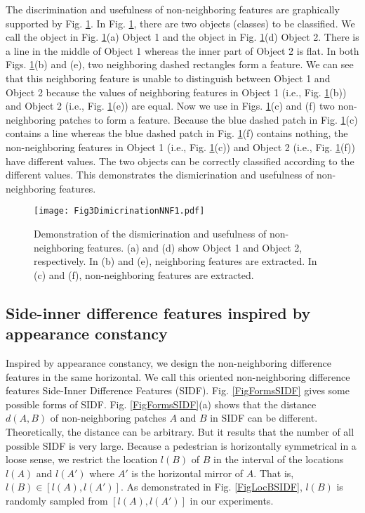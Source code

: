 \documentclass[10pt,twocolumn,letterpaper]{article}
\begin{document}
The discrimination and usefulness of non-neighboring features are 
graphically supported by Fig. \ref{FigDimicrinationNNF}. In Fig. \ref{FigDimicrinationNNF}, there are two objects (classes) 
to be classified. We call the object in Fig. \ref{FigDimicrinationNNF}(a) Object 1 and the object in 
Fig. \ref{FigDimicrinationNNF}(d) Object 2. There is a line 
in the middle of Object 1 whereas the inner part of Object 2 is flat. In both Figs. \ref{FigDimicrinationNNF}(b) and (e), two neighboring 
dashed rectangles form a feature. We can see that this neighboring feature 
is unable to distinguish between Object 1 and Object 2 because the values of 
neighboring features in Object 1 (i.e., Fig. \ref{FigDimicrinationNNF}(b)) and Object 2 (i.e., Fig. 
\ref{FigDimicrinationNNF}(e)) are equal. Now we use in Figs. \ref{FigDimicrinationNNF}(c) and (f) two non-neighboring 
patches to form a feature. Because the blue dashed patch in Fig. \ref{FigDimicrinationNNF}(c) 
contains a line whereas the blue dashed patch in Fig. \ref{FigDimicrinationNNF}(f) contains 
nothing, the non-neighboring features in Object 1 (i.e., Fig. \ref{FigDimicrinationNNF}(c)) and 
Object 2 (i.e., Fig. \ref{FigDimicrinationNNF}(f)) have different values. The two objects can be 
correctly classified according to the different values. This demonstrates 
the dismicrination and usefulness of non-neighboring features. 

\begin{figure}[!t]
\centering
\texttt{[image: Fig3DimicrinationNNF1.pdf]}
\caption{Demonstration of the dismicrination and usefulness of non-neighboring features. (a) and (d) show Object 1 and Object 2, respectively. In (b) and (e), neighboring features are extracted. In (c) and (f), non-neighboring features are extracted.}
\label{FigDimicrinationNNF}
\end{figure}

\subsection{Side-inner difference features inspired by appearance constancy}
Inspired by appearance constancy, we design the non-neighboring difference 
features in the same horizontal. We call this oriented non-neighboring 
difference features Side-Inner Difference Features (SIDF). Fig. \ref{FigFormsSIDF} gives some 
possible forms of SIDF. Fig. \ref{FigFormsSIDF}(a) shows that the distance $d(A,B)$ of non-neighboring patches $A$ and $B$ in SIDF can be 
different. Theoretically, the distance can be arbitrary. But it results that the number of all possible SIDF is very large. Because a pedestrian is 
horizontally symmetrical in a loose sense, we restrict the location 
$l(B)$ of $B$ in the interval of the locations $l(A)$ and $l(A')$ where $A'$ is 
the horizontal mirror of $A$. That is, $l(B)\in [l(A),l(A')]$. As 
demonstrated in Fig. \ref{FigLocBSIDF}, $l(B)$ is randomly sampled from $[l(A),l(A')]$ in our experiments. 
\end{document}

